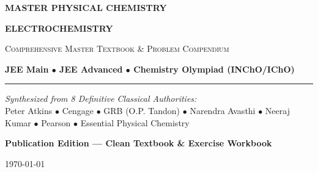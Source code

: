 \documentclass[11pt,a4paper,oneside]{report}
\begin{document}
\begin{titlepage}
    \centering
    \vspace*{2cm}
    {\Huge\bfseries\color{primarynavy} MASTER PHYSICAL CHEMISTRY\par}
    \vspace{0.8cm}
    {\Huge\bfseries\color{cengagegreen} ELECTROCHEMISTRY\par}
    \vspace{0.5cm}
    {\large\scshape Comprehensive Master Textbook \& Problem Compendium\par}
    \vspace{0.3cm}
    {\normalsize\color{accentamber}\textbf{JEE Main $\bullet$ JEE Advanced $\bullet$ Chemistry Olympiad (INChO/IChO)}\par}
    
    \vspace{2cm}
    \rule{0.8\textwidth}{1.5pt}
    \vspace{1.5cm}
    
    \begin{minipage}{0.8\textwidth}
        \small\centering
        \textit{Synthesized from 8 Definitive Classical Authorities:}\\
        Peter Atkins $\bullet$ Cengage $\bullet$ GRB (O.P. Tandon) $\bullet$ Narendra Avasthi $\bullet$ Neeraj Kumar $\bullet$ Pearson $\bullet$ Essential Physical Chemistry
    \end{minipage}
    
    \vfill
    {\large\bfseries Publication Edition --- Clean Textbook \& Exercise Workbook\par}
    \vspace{0.5cm}
    {\small \today\par}
\end{titlepage}

\tableofcontents
\newpage















\end{document}

